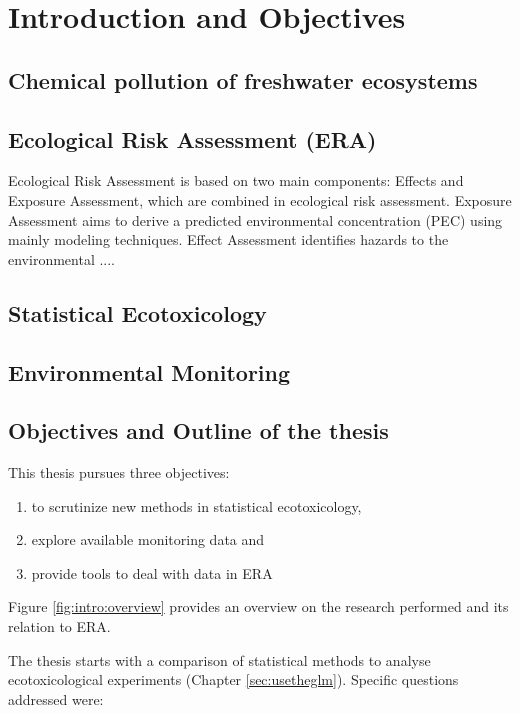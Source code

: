 \chapter{Introduction and Objectives}
\label{sec:introduction} 

\section{Chemical pollution of freshwater ecosystems}

\section{Ecological Risk Assessment (ERA)}
Ecological Risk Assessment is based on two main components: Effects and Exposure Assessment, which are combined in ecological risk assessment.
Exposure Assessment aims to derive a predicted environmental concentration (PEC) using mainly modeling techniques.
Effect Assessment identifies hazards to the environmental ....

\section{Statistical Ecotoxicology}

\section{Environmental Monitoring}




\section{Objectives and Outline of the thesis}
This thesis pursues three objectives: 
\begin{enumerate}[i]
	\item to scrutinize new methods in statistical ecotoxicology,
	\item explore available monitoring data and
	\item provide tools to deal with data in ERA
\end{enumerate}
Figure \ref{fig:intro:overview} provides an overview on the research performed and its relation to ERA.


\noindent
The thesis starts with a comparison of statistical methods to analyse ecotoxicological experiments (Chapter \ref{sec:usetheglm}). 
Specific questions addressed were:

